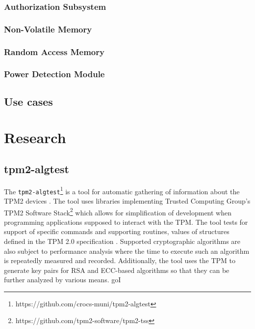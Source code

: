 \subsubsection{Authorization Subsystem}

\subsubsection{Non-Volatile Memory}

\subsubsection{Random Access Memory}

\subsubsection{Power Detection Module}







\subsection{Use cases}




\section{Research}


\subsection{tpm2-algtest}
The \texttt{tpm2-algtest}\footnote{https://github.com/crocs-muni/tpm2-algtest} is a tool for automatic gathering of information about the TPM2 devices \cite{Struk2019thesis}. The tool uses libraries implementing Trusted Computing Group's TPM2 Software Stack\footnote{https://github.com/tpm2-software/tpm2-tss} which allows for simplification of development when programming applications supposed to interact with the TPM. The tool tests for support of specific commands and supporting routines, values of structures defined in the TPM 2.0 specification \cite{tcg_p3_commands, tcg_p4_supproutines, tcg_p2_structures}. Supported cryptographic algorithms are also subject to performance analysis where the time to execute such an algorithm is repeatedly measured and recorded. Additionally, the tool uses the TPM to generate key pairs for RSA and ECC-based algorithms so that they can be further analyzed by various means.
goI
